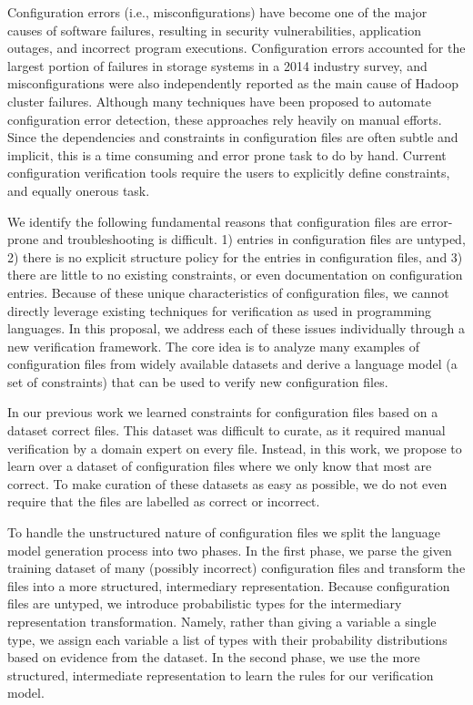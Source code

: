 Configuration errors (i.e., misconfigurations) have become one of the major causes of software failures, resulting in security vulnerabilities, application outages, and incorrect program executions. 
Configuration errors accounted for the largest portion of failures in storage systems in a 2014 industry survey, and misconfigurations were also independently reported as the main cause of Hadoop cluster failures. 
Although many techniques have been proposed to automate configuration error detection, these approaches rely heavily on manual efforts. 
Since the dependencies and constraints in configuration files are often subtle and implicit, this is a time consuming and error prone task to do by hand.
Current configuration verification tools require the users to explicitly define constraints, and equally onerous task.

We identify the following fundamental reasons that configuration files are error-prone and troubleshooting is difficult. 
  1) entries in configuration files are untyped, 
  2) there is no explicit structure policy for the entries in configuration files, and 
  3) there are little to no existing constraints, or even documentation on configuration entries.
Because of these unique characteristics of configuration files, we cannot directly leverage existing techniques for verification as used in programming languages. 
In this proposal, we address each of these issues individually through a new verification framework.
The core idea is to analyze many examples of configuration files from widely available datasets and derive a language model (a set of constraints) that can be used to verify new configuration files.

In our previous work we learned constraints for configuration files based on a dataset correct files.
This dataset was difficult to curate, as it required manual verification by a domain expert on every file.
Instead, in this work, we propose to learn over a dataset of configuration files where we only know that most are correct.
To make curation of these datasets as easy as possible, we do not even require that the files are labelled as correct or incorrect.

To handle the unstructured nature of configuration files we split the language model generation process into two phases. 
In the first phase, we parse the given training dataset of many (possibly incorrect) configuration files and transform the files into a more structured, intermediary representation. 
Because configuration files are untyped, we introduce probabilistic types for the intermediary representation transformation. 
Namely, rather than giving a variable a single type, we assign each variable a list of types with their probability distributions based on evidence from the dataset. 
In the second phase, we use the more structured, intermediate representation to learn the rules for our verification model. 

